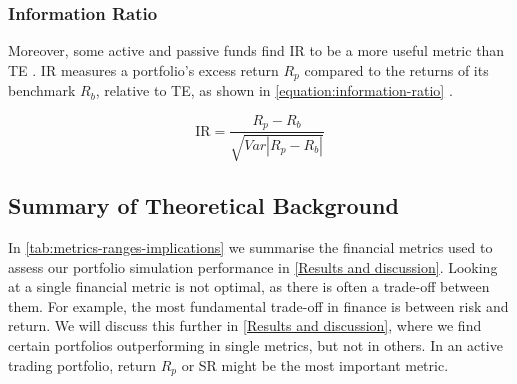 \subsubsection{Information Ratio}

Moreover, some active and passive funds find IR to be a more useful metric than TE \parencite{jorion-enhanced-index-funds-and-tracking-error-optimization}. IR measures a portfolio's excess return $R_p$ compared to the returns of its benchmark $R_b$, relative to TE, as shown in \autoref{equation:information-ratio} \parencite{goodwin-information-ratio}. 

\vspace{-1em}
\begin{equation}
\label{equation:information-ratio}
    \text{IR} = \frac{R_p - R_b}{\sqrt{Var \left| R_p-R_b \right| }}
\end{equation}

\subsection{Summary of Theoretical Background}

In \autoref{tab:metrics-ranges-implications} we summarise the financial metrics used to assess our portfolio simulation performance in \autoref{Results and discussion}. Looking at a single financial metric is not optimal, as there is often a trade-off between them. For example, the most fundamental trade-off in finance is between risk and return. We will discuss this further in \autoref{Results and discussion}, where we find certain portfolios outperforming in single metrics, but not in others. In an active trading portfolio, return $R_p$ or SR might be the most important metric. 


